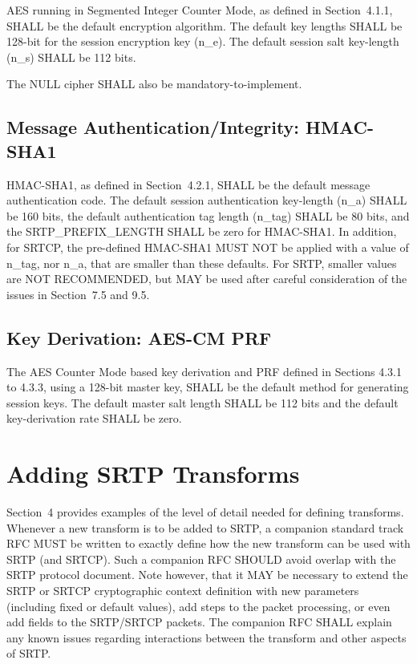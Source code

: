 \documentclass{article}
\begin{document}
AES running in Segmented Integer Counter Mode, as defined in Section~4.1.1, SHALL be the default encryption algorithm.  The default key lengths SHALL be 128-bit for the session encryption key (n\_e).  The default session salt key-length (n\_s) SHALL be 112 bits.

The NULL cipher SHALL also be mandatory-to-implement.

\subsection{Message Authentication/Integrity: HMAC-SHA1}

HMAC-SHA1, as defined in Section~4.2.1, SHALL be the default message authentication code.  The default session authentication key-length (n\_a) SHALL be 160 bits, the default authentication tag length (n\_tag) SHALL be 80 bits, and the SRTP\_PREFIX\_LENGTH SHALL be zero for HMAC-SHA1.  In addition, for SRTCP, the pre-defined HMAC-SHA1 MUST NOT be applied with a value of n\_tag, nor n\_a, that are smaller than these defaults.  For SRTP, smaller values are NOT RECOMMENDED, but MAY be used after careful consideration of the issues in Section~7.5 and 9.5.

\subsection{Key Derivation: AES-CM PRF}

The AES Counter Mode based key derivation and PRF defined in Sections 4.3.1 to 4.3.3, using a 128-bit master key, SHALL be the default method for generating session keys.  The default master salt length SHALL be 112 bits and the default key-derivation rate SHALL be zero.

\section{Adding SRTP Transforms}

Section~4 provides examples of the level of detail needed for defining transforms.  Whenever a new transform is to be added to SRTP, a companion standard track RFC MUST be written to exactly define how the new transform can be used with SRTP (and SRTCP).  Such a companion RFC SHOULD avoid overlap with the SRTP protocol document. Note however, that it MAY be necessary to extend the SRTP or SRTCP cryptographic context definition with new parameters (including fixed or default values), add steps to the packet processing, or even add fields to the SRTP/SRTCP packets.  The companion RFC SHALL explain any known issues regarding interactions between the transform and other aspects of SRTP.
\end{document}
